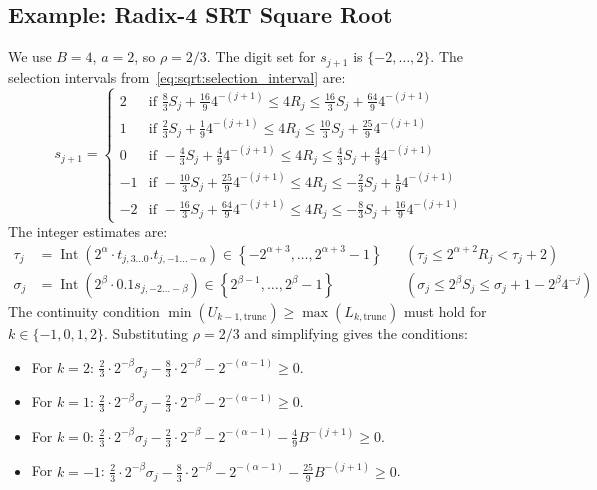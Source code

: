 \documentclass{article}
\DeclareMathOperator{\Int}{Int}
\begin{document}
\subsection{Example: Radix-4 SRT Square Root}
\label{ssec:sqrt:radix4}
We use $B = 4$, $a = 2$, so $\rho = 2/3$.
The digit set for $s_{j+1}$ is $\{-2, \dots, 2\}$.
The selection intervals from~\cref{eq:sqrt:selection_interval} are:
\begin{equation}
  \label{eq:sqrt:radix4_intervals}
  s_{j+1} =
  \begin{cases}
    2  & \text{if } \frac{8}{3} S_j + \frac{16}{9} 4^{-(j+1)} \leq 4 R_j \leq \frac{16}{3} S_j + \frac{64}{9} 4^{-(j+1)} \\
    1  & \text{if } \frac{2}{3} S_j + \frac{1}{9} 4^{-(j+1)} \leq 4 R_j \leq \frac{10}{3} S_j + \frac{25}{9} 4^{-(j+1)} \\
    0  & \text{if } -\frac{4}{3} S_j + \frac{4}{9} 4^{-(j+1)} \leq 4 R_j \leq \frac{4}{3} S_j + \frac{4}{9} 4^{-(j+1)} \\
    -1 & \text{if } -\frac{10}{3} S_j + \frac{25}{9} 4^{-(j+1)} \leq 4 R_j \leq -\frac{2}{3} S_j + \frac{1}{9} 4^{-(j+1)} \\
    -2 & \text{if } -\frac{16}{3} S_j + \frac{64}{9} 4^{-(j+1)} \leq 4 R_j \leq -\frac{8}{3} S_j + \frac{16}{9} 4^{-(j+1)}
  \end{cases}
\end{equation}
The integer estimates are:
\begin{align}
  \label{eq:sqrt:radix4_tau_def}
  \tau_j &= \Int(2^\alpha \cdot t_{j,3\ldots0}.t_{j,-1\ldots-\alpha}) \in \left\{-2^{\alpha+3}, \dots, 2^{\alpha+3}-1\right\} && (\tau_j \leq 2^{\alpha+2} R_j < \tau_j + 2) \\
  \label{eq:sqrt:radix4_sigma_def}
  \sigma_j &= \Int(2^\beta \cdot 0.1s_{j,-2\ldots-\beta}) \in \left\{2^{\beta-1}, \dots, 2^\beta-1\right\} && (\sigma_j \leq 2^\beta S_j \leq \sigma_j + 1 - 2^\beta 4^{-j})
\end{align}
The continuity condition $\min(U_{k-1,\mathrm{trunc}}) \geq \max(L_{k,\mathrm{trunc}})$ must hold for $k \in \{-1, 0, 1, 2\}$.
Substituting $\rho = 2/3$ and simplifying gives the conditions:
\begin{itemize}
  \item For $k = 2$: $\frac{2}{3} \cdot 2^{-\beta} \sigma_j - \frac{8}{3} \cdot 2^{-\beta} - 2^{-(\alpha-1)} \geq 0$.
  \item For $k = 1$: $\frac{2}{3} \cdot 2^{-\beta} \sigma_j - \frac{2}{3} \cdot 2^{-\beta} - 2^{-(\alpha-1)} \geq 0$.
  \item For $k = 0$: $\frac{2}{3} \cdot 2^{-\beta} \sigma_j - \frac{2}{3} \cdot 2^{-\beta} - 2^{-(\alpha-1)} - \frac{4}{9} B^{-(j+1)} \geq 0$.
  \item For $k = -1$: $\frac{2}{3} \cdot 2^{-\beta} \sigma_j - \frac{8}{3} \cdot 2^{-\beta} - 2^{-(\alpha-1)} - \frac{25}{9} B^{-(j+1)} \geq 0$.
\end{itemize}
\end{document}

